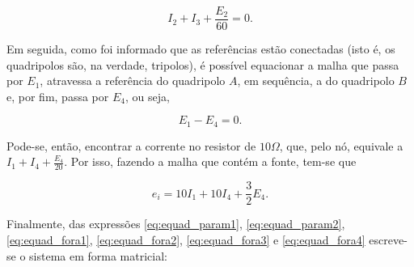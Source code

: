 \documentclass{article}
\numberwithin{equation}{section}
\let\dfr\dfrac
\begin{document}
\begin{equation}
    I_2+I_3+\dfr{E_2}{60}=0. \label{eq:equad_fora2}
\end{equation}

\noindent Em seguida, como foi informado que as referências estão conectadas (isto é, os quadripolos são, na verdade, tripolos), é possível equacionar a malha que passa por $E_1$, atravessa a referência do quadripolo $A$, em sequência, a do quadripolo $B$ e, por fim, passa por $E_4$, ou seja,

\begin{equation}
    E_1-E_4=0. \label{eq:equad_fora3}
\end{equation}

\noindent Pode-se, então, encontrar a corrente no resistor de $10\Omega$, que, pelo nó, equivale a $I_1+I_4+\frac{E_4}{20}$. Por isso, fazendo a malha que contém a fonte, tem-se que

\begin{equation}
    e_i = 10I_1+10I_4+\dfr{3}{2}E_4 \label{eq:equad_fora4}.
\end{equation}

\noindent Finalmente, das expressões \eqref{eq:equad_param1}, \eqref{eq:equad_param2}, \eqref{eq:equad_fora1}, \eqref{eq:equad_fora2}, \eqref{eq:equad_fora3} e \eqref{eq:equad_fora4} escreve-se o sistema em forma matricial:
\end{document}
